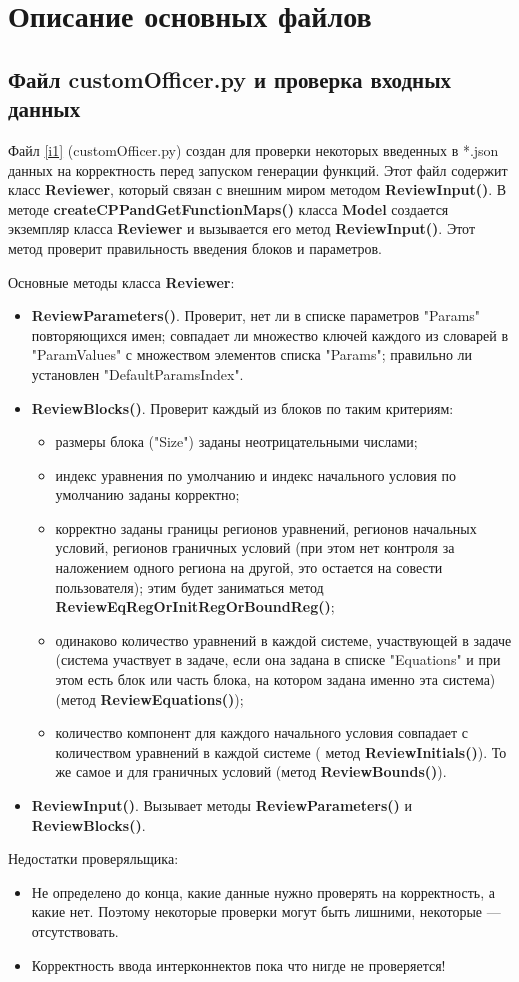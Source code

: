 \documentclass[a4paper]{article}
\begin{document}
\newpage
\section{\LARGE{Описание основных файлов}}
\subsection{\Large Файл customOfficer.py и проверка входных данных}
Файл \ref{i1} (customOfficer.py) создан для проверки некоторых введенных в *.json данных на корректность перед запуском генерации функций. Этот файл содержит класс {\bf Reviewer}, который связан с внешним миром методом {\bf ReviewInput()}. В методе {\bf createCPPandGetFunctionMaps()} класса {\bf Model} создается экземпляр класса {\bf Reviewer} и вызывается его метод {\bf ReviewInput()}. Этот метод проверит правильность введения бло\-ков и параметров.

Основные методы класса {\bf Reviewer}:
\begin{itemize}
\item {\bf ReviewParameters()}. Проверит, нет ли в списке параметров "Pa\-rams" повторяющихся имен; совпадает ли множество ключей каждого из словарей в "ParamValues" с множеством элементов списка "Params"; правильно ли установлен "DefaultParamsIndex".
\item {\bf ReviewBlocks()}. Проверит каждый из блоков по таким критериям: 
	\begin{itemize}
	\item размеры блока ("Size") заданы неотрицательными числами;
	\item индекс уравнения по умолчанию и индекс начального условия по умолчанию заданы корректно;
	\item корректно заданы границы регионов уравнений, регионов на\-чаль\-ных условий, регионов граничных условий (при этом нет контроля за наложением одного региона на 	другой, это остается на совести пользователя); этим будет заниматься метод {\bf ReviewEqRegOrInitRegOrBoundReg()};
	\item одинаково количество уравнений в каждой системе, участвующей в задаче (система участвует в задаче, если она задана в списке "Equations" и при этом есть блок или часть блока, на котором задана именно эта система) (метод {\bf ReviewEquations()});
	\item количество компонент для каждого начального условия совпадает с количеством уравнений в каждой системе ( метод {\bf ReviewInitials()}). То же самое и для граничных условий (метод {\bf ReviewBounds()}).
	\end{itemize}
\item {\bf ReviewInput()}. Вызывает методы {\bf ReviewParameters()} и {\bf ReviewBlocks()}.
\end{itemize}
Недостатки проверяльщика:
\begin{itemize}
\item Не определено до конца, какие данные нужно проверять на корректность, а какие нет. Поэтому некоторые проверки могут быть лишними, некоторые --- отсутствовать.
\item Корректность ввода интерконнектов пока что нигде не проверяется!
\end{itemize}
\end{document}
